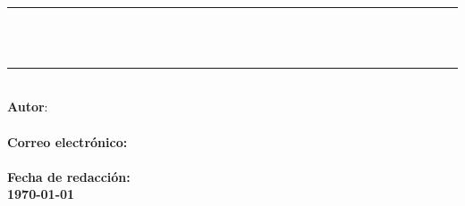 %
%
\begin{titlepage}
%
\newcommand{\HRule}{\rule{\linewidth}{0.5mm}}
\center
%
\textsc{\Large \cabecera}\\[0.5cm]
%
\HRule \\[0.4cm]%
{ \huge \bfseries \titulo}\\[0.4cm]
\HRule \\[1.5cm]%
%
\Large \textbf{Autor}:\\
\textsc{\textbf{\autor}}\\[1cm]
%
\large \textbf{Correo electrónico:}\\ \href{mailto:}{\ecorreo}\\[1cm]
\large \textbf{Fecha de redacción:}\\
\textbf{\today}\\[1cm] 
%
%
%
\vfill%
%
\end{titlepage}
